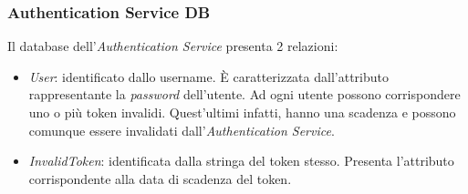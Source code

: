 \newpage
\subsubsection{Authentication Service DB}
Il database dell'\textit{Authentication Service} presenta 2 relazioni: 
\begin{itemize}
    \item \textit{User}: identificato dallo username. È caratterizzata dall'attributo rappresentante la \textit{password} dell'utente. Ad ogni utente possono corrispondere uno o più token invalidi. Quest'ultimi infatti, hanno una scadenza e possono comunque essere invalidati dall'\textit{Authentication Service}. 
    \item \textit{InvalidToken}: identificata dalla stringa del token stesso. Presenta l'attributo corrispondente alla data di scadenza del token.
\end{itemize}

